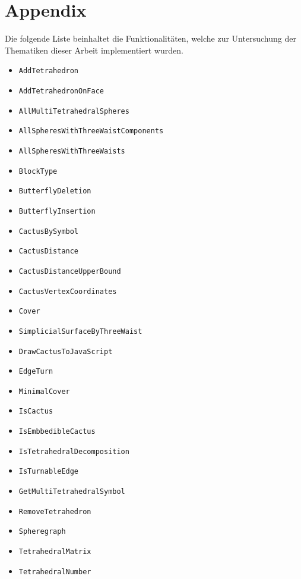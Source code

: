\documentclass[12pt,titlepage,twoside,cleardoublepage]{article}
\theoremstyle{nummermitklammern}
\numberwithin{equation}{section}
\begin{document}
\section*{Appendix}
Die folgende Liste beinhaltet die Funktionalitäten, welche zur Untersuchung der Thematiken dieser Arbeit implementiert wurden.
\begin{itemize}
\item \texttt{AddTetrahedron}
\item \texttt{AddTetrahedronOnFace}
\item \texttt{AllMultiTetrahedralSpheres}
\item \texttt{AllSpheresWithThreeWaistComponents}
\item \texttt{AllSpheresWithThreeWaists}
\item \texttt{BlockType}
\item \texttt{ButterflyDeletion}
\item \texttt{ButterflyInsertion}
\item \texttt{CactusBySymbol}
\item \texttt{CactusDistance}
\item \texttt{CactusDistanceUpperBound}
\item \texttt{CactusVertexCoordinates}
\item \texttt{Cover}
\item \texttt{SimplicialSurfaceByThreeWaist}
\item \texttt{DrawCactusToJavaScript}
\item \texttt{EdgeTurn}
\item \texttt{MinimalCover}
\item \texttt{IsCactus}
\item \texttt{IsEmbbedibleCactus}
\item \texttt{IsTetrahedralDecomposition}
\item \texttt{IsTurnableEdge}
\item \texttt{GetMultiTetrahedralSymbol}
\item \texttt{RemoveTetrahedron}
\item \texttt{Spheregraph}
\item \texttt{TetrahedralMatrix}
\item \texttt{TetrahedralNumber}
\end{itemize}
\end{document}
